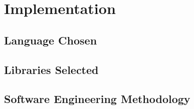 \chapter{Implementation}

\section{Language Chosen}



\section{Libraries Selected}



\section{Software Engineering Methodology}



